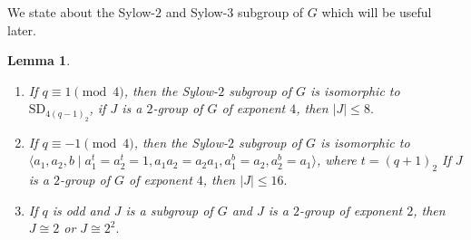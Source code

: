 \documentclass[12pt,reqno]{amsart}
\newcommand{\lr}{\langle}
\newcommand{\rr}{\rangle}
\theoremstyle{plain}
\newtheorem{lemma}[proposition]{Lemma}
\theoremstyle{definition}
\begin{document}
We state about the Sylow-$2$ and Sylow-$3$ subgroup of $G$ which will be useful later.
\begin{lemma}\label{Syl-2}
	\begin{enumerate}[\rm(i)]
		\item If $q\equiv 1\pmod 4$, then the Sylow-$2$ subgroup of $G$ is isomorphic to $\mathrm{SD}_{4(q-1)_2}$, if $J$ is a $2$-group of $G$ of exponent $4$, then $|J|\le 8.$
		\item If $q\equiv -1 \pmod 4$, then the Sylow-$2$ subgroup of $G$ is isomorphic to $\lr a_1,a_2, b\mid a_1^t=a_2^t=1,a_1a_2=a_2a_1,a_1^b=a_2,a_2^b=a_1 \rr$, where $t=(q+1)_2$ If $J$ is a $2$-group of $G$ of exponent $4$, then $|J|\le 16.$
		\item If $q$ is odd and $J$ is a subgroup of $G$ and $J$ is a $2$-group of exponent $2$, then  $J\cong 2$ or $J\cong 2^2.$
	\end{enumerate}
\end{lemma}
\end{document}

